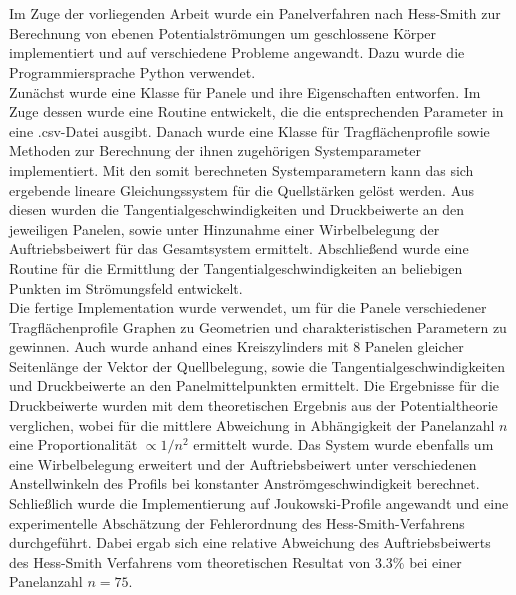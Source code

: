\chapter*{\abstractname} %
Im Zuge der vorliegenden Arbeit wurde ein Panelverfahren nach Hess-Smith zur Berechnung von ebenen Potentialströmungen um geschlossene Körper implementiert und auf verschiedene Probleme angewandt. Dazu wurde die Programmiersprache Python verwendet.
\\
Zunächst wurde eine Klasse für Panele und ihre Eigenschaften entworfen. Im Zuge dessen wurde eine Routine entwickelt, die die entsprechenden Parameter in eine .csv-Datei ausgibt. Danach wurde eine Klasse für Tragflächenprofile sowie Methoden zur Berechnung der ihnen zugehörigen Systemparameter implementiert. Mit den somit berechneten Systemparametern kann das sich ergebende lineare Gleichungssystem für die Quellstärken gelöst werden. Aus diesen wurden die Tangentialgeschwindigkeiten und Druckbeiwerte an den jeweiligen Panelen, sowie unter Hinzunahme einer Wirbelbelegung der Auftriebsbeiwert für das Gesamtsystem ermittelt. Abschließend wurde eine Routine für die Ermittlung der Tangentialgeschwindigkeiten an beliebigen Punkten im Strömungsfeld entwickelt.
\\
Die fertige Implementation wurde verwendet, um für die Panele verschiedener Tragflächenprofile Graphen zu Geometrien und charakteristischen Parametern zu gewinnen. Auch wurde anhand eines Kreiszylinders mit 8 Panelen gleicher Seitenlänge der Vektor der Quellbelegung, sowie die Tangentialgeschwindigkeiten und Druckbeiwerte an den Panelmittelpunkten ermittelt. Die Ergebnisse für die Druckbeiwerte wurden mit dem theoretischen Ergebnis aus der Potentialtheorie verglichen, wobei für die mittlere Abweichung in Abhängigkeit der Panelanzahl $n$ eine Proportionalität $\propto 1 / n^2$ ermittelt wurde. Das System wurde ebenfalls um eine Wirbelbelegung erweitert und der Auftriebsbeiwert unter verschiedenen Anstellwinkeln des Profils bei konstanter Anströmgeschwindigkeit berechnet. 
\\
Schließlich wurde die Implementierung auf  Joukowski-Profile angewandt und eine experimentelle Abschätzung der Fehlerordnung des Hess-Smith-Verfahrens durchgeführt. Dabei ergab sich eine relative Abweichung des Auftriebsbeiwerts des Hess-Smith Verfahrens vom theoretischen Resultat von $3.3 \%$ bei einer Panelanzahl $n=75$.

\newpage
